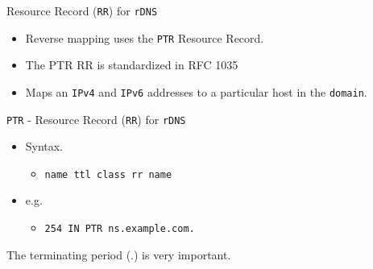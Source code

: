 \documentclass[xcolor=table]{beamer}
\begin{document}
\begin{frame}{Resource Record (\texttt{RR}) for \texttt{rDNS}}
  \begin{itemize}
    \item Reverse mapping uses the \texttt{PTR} Resource Record.
    \item The PTR RR is standardized in RFC 1035
    \item Maps an \texttt{IPv4} and \texttt{IPv6} addresses to a particular host in the \texttt{domain}.
  \end{itemize}
\end{frame}

\begin{frame}{\texttt{PTR} - Resource Record (\texttt{RR}) for \texttt{rDNS}}
  \begin{itemize}
    \item Syntax.
      \begin{itemize}
        \item \texttt{name ttl class rr name}
      \end{itemize}
    \item e.g.
      \begin{itemize}
        \item \texttt{254     IN PTR ns.example.com.}
      \end{itemize}
  \end{itemize}
  \begin{tcolorbox}[title={\textbf{NOTE:}}]
    \begin{center}
      \scriptsize The terminating period (.) is very important.
    \end{center}
  \end{tcolorbox}
\end{frame}
\end{document}
